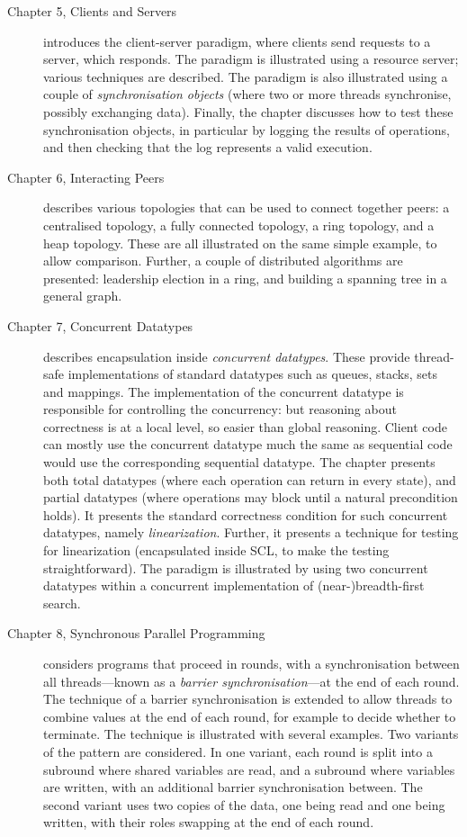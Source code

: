 \documentclass[12pt,a4paper]{article}
\begin{document}
\begin{description}
\item[Chapter 5, Clients and Servers] introduces the client-server paradigm,
  where clients send requests to a server, which responds.  The paradigm is
  illustrated using a resource server; various techniques are described.  The
  paradigm is also illustrated using a couple of \emph{synchronisation
    objects} (where two or more threads synchronise, possibly exchanging
  data).  Finally, the chapter discusses how to test these synchronisation
  objects, in particular by logging the results of operations, and then
  checking that the log represents a valid execution.

\item[Chapter 6, Interacting Peers] describes various topologies that can be
  used to connect together peers: a centralised topology, a fully connected
  topology, a ring topology, and a heap topology.  These are all illustrated
  on the same simple example, to allow comparison.  Further, a couple of
  distributed algorithms are presented: leadership election in a ring, and
  building a spanning tree in a general graph.  

\item[Chapter 7, Concurrent Datatypes] describes encapsulation inside
  \emph{concurrent datatypes}.  These provide thread-safe implementations of
  standard datatypes such as queues, stacks, sets and mappings.  The
  implementation of the concurrent datatype is responsible for controlling the
  concurrency: but reasoning about correctness is at a local level, so easier
  than global reasoning.  Client code can mostly use the concurrent datatype
  much the same as sequential code would use the corresponding sequential
  datatype.  The chapter presents both total datatypes (where each operation
  can return in every state), and partial datatypes (where operations may
  block until a natural precondition holds).  It presents the standard
  correctness condition for such concurrent datatypes, namely
  \emph{linearization}.  Further, it presents a technique for testing for
  linearization (encapsulated inside SCL, to make the testing
  straightforward).  The paradigm is illustrated by using two concurrent
  datatypes within a concurrent implementation of (near-)breadth-first search.

\item[Chapter 8, Synchronous Parallel Programming] considers programs that
  proceed in rounds, with a synchronisation between all threads---known as a
  \emph{barrier synchronisation}---at the end of each round.  The technique of
  a barrier synchronisation is extended to allow threads to combine values at
  the end of each round, for example to decide whether to terminate.  The
  technique is illustrated with several examples.  Two variants of the pattern
  are considered.  In one variant, each round is split into a subround where
  shared variables are read, and a subround where variables are written, with
  an additional barrier synchronisation between.  The second variant uses two
  copies of the data, one being read and one being written, with their roles
  swapping at the end of each round.


\end{description}
\end{document}
